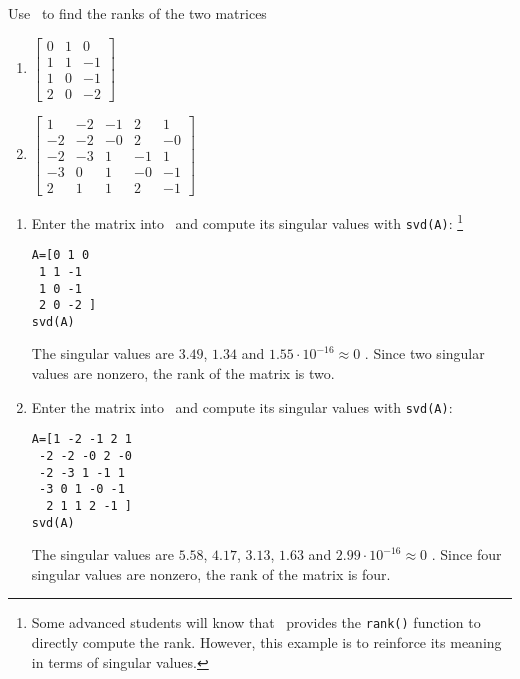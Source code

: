 \begin{example} \label{eg:}
Use \script\ to find the ranks of the two matrices
\begin{enumerate}
\item \(\begin{bmatrix}    0 & 1 & 0
\\ 1 & 1 & -1
\\ 1 & 0 & -1
\\ 2 & 0 & -2
 \end{bmatrix}\)
 \item \(\begin{bmatrix}    1 & -2 & -1 & 2 & 1
\\ -2 & -2 & -0 & 2 & -0
\\ -2 & -3 & 1 & -1 & 1
\\ -3 & 0 & 1 & -0 & -1
\\ 2 & 1 & 1 & 2 & -1
 \end{bmatrix}\)
\end{enumerate}
\begin{solution} 
\begin{enumerate}
\item Enter the matrix into \script\ and compute its singular values with \verb|svd(A)|:
\footnote{Some advanced students will know that \script\ provides the \texttt{rank()} function to directly compute the rank.  However, this example is to reinforce its meaning in terms of singular values.}
\setbox\ajrqrbox\hbox{}%
\marginpar{\usebox{\ajrqrbox\\[2ex]}}%
\begin{verbatim}
A=[0 1 0
 1 1 -1
 1 0 -1
 2 0 -2 ]
svd(A)
\end{verbatim}
The singular values are \(3.49\), \(1.34\) and \(1.55\cdot10^{-16}\approx0\) \twodp.
Since two singular values are nonzero, the rank of the matrix is two.

\item Enter the matrix into \script\ and compute its singular values with \verb|svd(A)|:
\setbox\ajrqrbox\hbox{}%
\marginpar{\usebox{\ajrqrbox\\[2ex]}}%
\begin{verbatim}
A=[1 -2 -1 2 1
 -2 -2 -0 2 -0
 -2 -3 1 -1 1
 -3 0 1 -0 -1
  2 1 1 2 -1 ]
svd(A)
\end{verbatim}
The singular values are \(5.58\), \(4.17\), \(3.13\), \(1.63\) and \(2.99\cdot10^{-16}\approx0\) \twodp.
Since four singular values are nonzero, the rank of the matrix is four.
\end{enumerate}
\end{solution}
\end{example}



